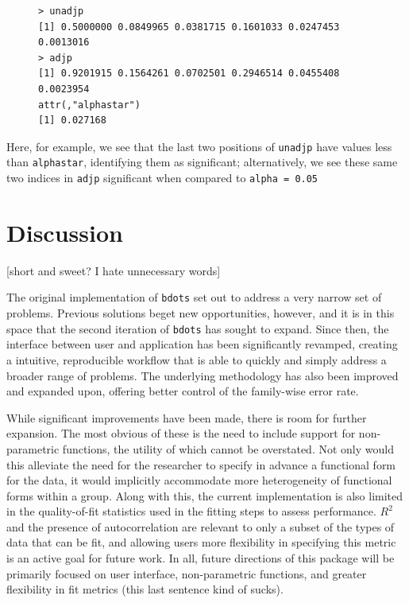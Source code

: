 \documentclass{article}
\newcommand{\xt}{\texttt}%
\begin{document}
\begin{singlespace}
\begin{figure}[H]
\centering
\begin{BVerbatim}
> unadjp
[1] 0.5000000 0.0849965 0.0381715 0.1601033 0.0247453 0.0013016
> adjp
[1] 0.9201915 0.1564261 0.0702501 0.2946514 0.0455408 0.0023954
attr(,"alphastar")
[1] 0.027168
\end{BVerbatim}
\end{figure}
\end{singlespace}

Here, for example, we see that the last two positions of \xt{unadjp} have values less than \xt{alphastar}, identifying them as significant; alternatively, we see these same two indices in \xt{adjp} significant when compared to \xt{alpha = 0.05}

\section{Discussion}

[short and sweet? I hate unnecessary words]

The original implementation of \xt{bdots} set out to address a very narrow set of problems. Previous solutions beget new opportunities, however, and it is in this space that the second iteration of \xt{bdots} has sought to expand. Since then, the interface between user and application has been significantly revamped, creating a intuitive, reproducible workflow that is able to quickly and simply address a broader range of problems. The underlying methodology has also been improved and expanded upon, offering better control of the family-wise error rate.

While significant improvements have been made, there is room for further expansion. The most obvious of these is the need to include support for non-parametric functions, the utility of which cannot be overstated. Not only would this alleviate the need for the researcher to specify in advance a functional form for the data, it would implicitly accommodate more heterogeneity of functional forms within a group. Along with this, the current implementation is also limited in the quality-of-fit statistics used in the fitting steps to assess performance. $R^2$ and the presence of autocorrelation are relevant to only a subset of the types of data that can be fit, and allowing users more flexibility in specifying this metric is an active goal for future work. In all, future directions of this package will be primarily focused on user interface, non-parametric functions, and greater flexibility in fit metrics (this last sentence kind of sucks).
\end{document}
